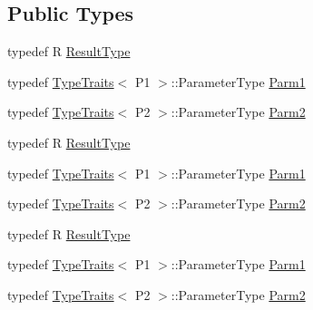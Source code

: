\subsection*{Public Types}
\begin{DoxyCompactItemize}
\item 
typedef R \mbox{\hyperlink{classUtil_1_1FunctorImpl_3_01R_00_01TYPELIST__2_07P1_00_01P2_08_4_a8ab08e094f480f249310bded4d609837}{Result\+Type}}
\item 
typedef \mbox{\hyperlink{classUtil_1_1TypeTraits}{Type\+Traits}}$<$ P1 $>$\+::Parameter\+Type \mbox{\hyperlink{classUtil_1_1FunctorImpl_3_01R_00_01TYPELIST__2_07P1_00_01P2_08_4_a74b37eda530bf33969c4a0eadc2596a5}{Parm1}}
\item 
typedef \mbox{\hyperlink{classUtil_1_1TypeTraits}{Type\+Traits}}$<$ P2 $>$\+::Parameter\+Type \mbox{\hyperlink{classUtil_1_1FunctorImpl_3_01R_00_01TYPELIST__2_07P1_00_01P2_08_4_a9df4ce5861151ea2ca3416ee19140d5f}{Parm2}}
\item 
typedef R \mbox{\hyperlink{classUtil_1_1FunctorImpl_3_01R_00_01TYPELIST__2_07P1_00_01P2_08_4_a8ab08e094f480f249310bded4d609837}{Result\+Type}}
\item 
typedef \mbox{\hyperlink{classUtil_1_1TypeTraits}{Type\+Traits}}$<$ P1 $>$\+::Parameter\+Type \mbox{\hyperlink{classUtil_1_1FunctorImpl_3_01R_00_01TYPELIST__2_07P1_00_01P2_08_4_a74b37eda530bf33969c4a0eadc2596a5}{Parm1}}
\item 
typedef \mbox{\hyperlink{classUtil_1_1TypeTraits}{Type\+Traits}}$<$ P2 $>$\+::Parameter\+Type \mbox{\hyperlink{classUtil_1_1FunctorImpl_3_01R_00_01TYPELIST__2_07P1_00_01P2_08_4_a9df4ce5861151ea2ca3416ee19140d5f}{Parm2}}
\item 
typedef R \mbox{\hyperlink{classUtil_1_1FunctorImpl_3_01R_00_01TYPELIST__2_07P1_00_01P2_08_4_a8ab08e094f480f249310bded4d609837}{Result\+Type}}
\item 
typedef \mbox{\hyperlink{classUtil_1_1TypeTraits}{Type\+Traits}}$<$ P1 $>$\+::Parameter\+Type \mbox{\hyperlink{classUtil_1_1FunctorImpl_3_01R_00_01TYPELIST__2_07P1_00_01P2_08_4_a74b37eda530bf33969c4a0eadc2596a5}{Parm1}}
\item 
typedef \mbox{\hyperlink{classUtil_1_1TypeTraits}{Type\+Traits}}$<$ P2 $>$\+::Parameter\+Type \mbox{\hyperlink{classUtil_1_1FunctorImpl_3_01R_00_01TYPELIST__2_07P1_00_01P2_08_4_a9df4ce5861151ea2ca3416ee19140d5f}{Parm2}}
\end{DoxyCompactItemize}
